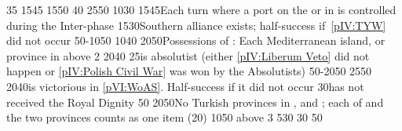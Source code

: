 %
%
{}{35}{\EU@objFranceContained}%
%
\EUobjective{}{\continentAmerica}{\COL}%
{15}{45}{\EU@objAmericaHOL}%
%
\EUobjective{}{\continentIndia}{\TP/\COL}%
{15}{50}{}%
%
 
%
%
{}{40}{\EU@objHalfHungary}%
%
%
{25}{50}{\EU@objGermanEmpire}%
%
%
{10}{30}{\EU@objBigAustria}%
%
%
{15}{45}{Each turn where a port on the \regionBaltique or in
  \payshanse is controlled during the Inter-phase}%
%
%
{15}{30}{Southern \HRE alliance exists; half-success if~\ref{pIV:TYW} did not
  occur}%
%
%
%
{50-10}{50}{}%
%
%
{10}{40}{\EU@objSpanishNetherlands}%
%
%
{20}{50}{Possessions of : Each Mediterranean island, or province
  in  above 2}%
%
%
{20}{40}{}%
%
%
{}{25}{\paysmajeurPologne is absolutist (either \ref{pIV:Liberum Veto} did not
happen or \ref{pIV:Polish Civil War} was won by the Absolutists)}%
%
%
%
{50-20}{50}{}%
%
%
{25}{50}{\EU@objWoSS}%
%
%
{20}{40}{\AUS is victorious in \ref{pVI:WoAS}. Half-success if it did not
  occur}%
%
%
{}{30}{\paysmajeurPrusse has not received the Royal Dignity}%
%
%
{}{50}{\EU@objSilesie}%
%
%
%
{20}{50}{No Turkish provinces in \payshongrie, \provinceBosna and
  \provinceSerbia; each of \payshongrie and the two provinces counts as one
  item (20\VPs)}%
%
%
{10}{50}{\EU@objEachProvinceOther{\paysNaples} above 3}%
%
%
{5}{30}{\EU@objAlliance}%
%
%
{}{30}{\EU@objFranceContained}%
%
%
{}{50}{\EU@objSilesie}%
%
 
%
%
